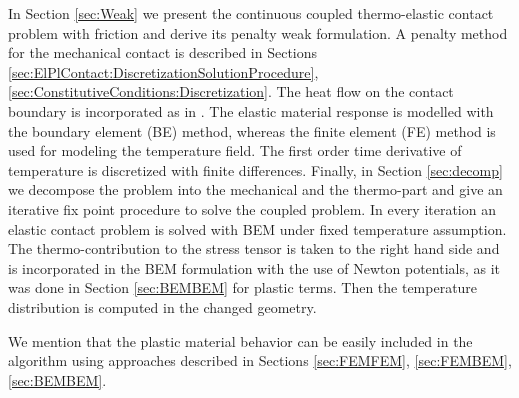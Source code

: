 In Section \ref{sec:Weak} we present the continuous coupled thermo-elastic contact problem with friction and  derive its penalty weak formulation.  A penalty method for the mechanical contact is  described in Sections \ref{sec:ElPlContact:DiscretizationSolutionProcedure}, \ref{sec:ConstitutiveConditions:Discretization}. The  heat flow on the contact boundary is incorporated as in \cite{JoKl93}. The elastic material response is modelled with the boundary element (BE) method, whereas the finite element (FE) method is used for modeling the temperature field. The first order time derivative of temperature is discretized with finite differences. Finally, in Section \ref{sec:decomp} we decompose the problem into the mechanical and the thermo-part and give an iterative fix point procedure to solve the coupled problem. In every iteration an elastic contact problem is solved with BEM under fixed temperature assumption. The thermo-contribution to the stress tensor is taken to the right hand side and is incorporated in the BEM formulation with the use of Newton potentials, as it was done in Section \ref{sec:BEMBEM} for plastic terms. Then the temperature distribution is computed in the changed geometry.

We mention that the plastic material behavior can be easily included in the algorithm using approaches described in Sections \ref{sec:FEMFEM}, \ref{sec:FEMBEM}, \ref{sec:BEMBEM}.

